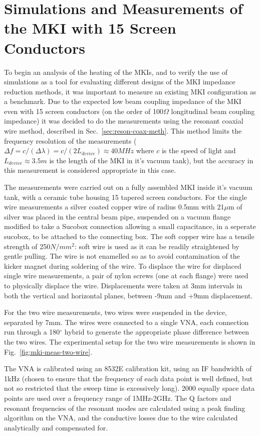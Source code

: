\section{Simulations and Measurements of the MKI with 15 Screen Conductors}

To begin an analysis of the heating of the MKIs, and to verify the use of simulations as a tool for evaluating different designs of the MKI impedance reduction methods, it was important to measure an existing MKI configuration as a benchmark. Due to the expected low beam coupling impedance of the MKI even with 15 screen conductors (on the order of 100$\Omega$ longitudinal beam coupling impedance) it was decided to do the measurements using the resonant coaxial wire method, described in Sec.~\ref{sec:reson-coax-meth}. This method limits the frequency resolution of the measurements ($\Delta{} f = c/ (\Delta \lambda) = c/(2L_{device}) \approx 40MHz$ where $c$ is the speed of light and $L_{device}\approx 3.5m$ is the length of the MKI in it's vacuum tank), but the accuracy in this measurement is considered appropriate in this case.

The measurements were carried out on a fully assembled MKI inside it's vacuum tank, with a ceramic tube housing 15 tapered screen conductors. For the single wire measurements a silver coated copper wire of radius 0.5mm with 21$\mu$m of silver was placed in the central beam pipe, suspended on a vacuum flange modified to take a Sucobox connection allowing a small capacitance, in a seperate sucobox, to be attached to the connecting box. The soft copper wire has a tensile strength of 250$N/mm^{2}$: soft wire is used as it can be readily straightened by gentle pulling. The wire is not enamelled so as to avoid contamination of the kicker magnet during soldering of the wire. To displace the wire for displaced single wire measurements, a pair of nylon screws (one at each flange) were used to physically displace the wire. Displacements were taken at 3mm intervals in both the vertical and horizontal planes, between -9mm and +9mm displacement.

For the two wire measurements, two wires were suspended in the device, separated by 7mm. The wires were connected to a single VNA, each connection run through a 180$^{\circ}$ hybrid to generate the appropriate phase difference between the two wires. The experimental setup for the two wire measurements is shown in Fig.~\ref{fig:mki-meas-two-wire}.

The VNA is calibrated using an 8532E calibration kit, using an IF bandwidth of 1kHz (chosen to ensure that the frequency of each data point is well defined, but not so restricted that the sweep time is excessively long). 2000 equally space data points are used over a frequency range of 1MHz-2GHz. The Q factors and resonant frequencies of the resonant modes are calculated using a peak finding algorithm on the VNA, and the conductive losses due to the wire calculated analytically and compensated for.


